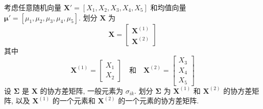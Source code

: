\quad 考虑任意随机向量 $\mathbf{X}'=[X_{1},X_{2},X_{3},X_{4},X_{5}]$ 和均值向量 $\boldsymbol{\mu}'=[\mu_{1},\mu_{2},\mu_{3},\mu_{4},\mu_{5}]$. 划分 $\mathbf{X}$ 为
\[
\mathbf{X}=\begin{bmatrix}\mathbf{X}^{(1)}\\\mathbf{X}^{(2)}\end{bmatrix}
\]
其中
\[
\mathbf{X}^{(1)}=\begin{bmatrix}X_{1}\\X_{2}\end{bmatrix}\quad\text{和}\quad
\mathbf{X}^{(2)}=\begin{bmatrix}X_{3}\\X_{4}\\X_{5}\end{bmatrix}
\]
设 $\boldsymbol{\Sigma}$ 是 $\mathbf{X}$ 的协方差矩阵, 一般元素为 $\sigma_{ik}$. 划分 $\boldsymbol{\Sigma}$ 为 $\mathbf{X}^{(1)}$ 和 $\mathbf{X}^{(2)}$ 的协方差矩阵, 以及 $\mathbf{X}^{(1)}$ 的一个元素和 $\mathbf{X}^{(2)}$ 的一个元素的协方差矩阵.

